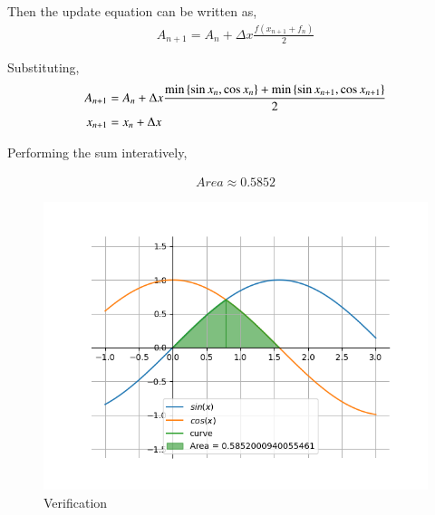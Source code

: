 \documentclass[journal]{IEEEtran}
\begin{document}
    Then the update equation can be written as,
    \begin{align}
        A_{n+1} = A_n + \Delta x \frac{f(x_{n+1}+f_n)}{2}
    \end{align}
    
    Substituting,
    \begin{align}
        A_{n+1} &= A_n + \Delta x \frac{\min\left\{\sin{x_n},\cos{x_n}\right\} + \min\left\{\sin{x_{n+1}},\cos{x_{n+1}}\right\}}{2}\\
        x_{n+1} &= x_n + \Delta x
    \end{align}

    Performing the sum interatively,
    
    \begin{align}
        Area \approx 0.5852
    \end{align}


    \begin{figure}[ht]  
        \centering  
        \includegraphics[width=\columnwidth]{figs/fig1.png}  
        \caption{Verification}
    \end{figure}
\end{document}
